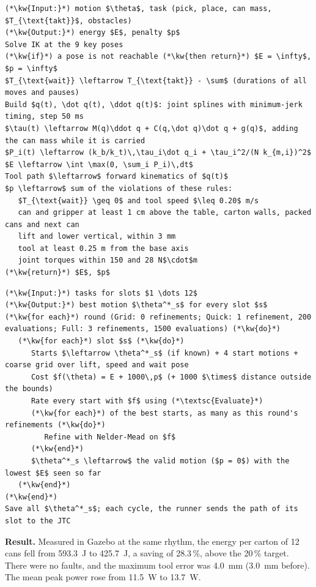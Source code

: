 \documentclass[12pt,a4paper]{article}
\newcommand{\kw}[1]{\textbf{#1}}
\begin{document}
\noindent\begin{minipage}{\linewidth}
\label{alg:eval}
\begin{lstlisting}[style=pseudostyle]
(*\kw{Input:}*) motion $\theta$, task (pick, place, can mass, $T_{\text{takt}}$, obstacles)
(*\kw{Output:}*) energy $E$, penalty $p$
Solve IK at the 9 key poses
(*\kw{if}*) a pose is not reachable (*\kw{then return}*) $E = \infty$, $p = \infty$
$T_{\text{wait}} \leftarrow T_{\text{takt}} - \sum$ (durations of all moves and pauses)
Build $q(t), \dot q(t), \ddot q(t)$: joint splines with minimum-jerk timing, step 50 ms
$\tau(t) \leftarrow M(q)\ddot q + C(q,\dot q)\dot q + g(q)$, adding the can mass while it is carried
$P_i(t) \leftarrow (k_b/k_t)\,\tau_i\dot q_i + \tau_i^2/(N k_{m,i})^2$
$E \leftarrow \int \max(0, \sum_i P_i)\,dt$
Tool path $\leftarrow$ forward kinematics of $q(t)$
$p \leftarrow$ sum of the violations of these rules:
   $T_{\text{wait}} \geq 0$ and tool speed $\leq 0.20$ m/s
   can and gripper at least 1 cm above the table, carton walls, packed cans and next can
   lift and lower vertical, within 3 mm
   tool at least 0.25 m from the base axis
   joint torques within 150 and 28 N$\cdot$m
(*\kw{return}*) $E$, $p$
\end{lstlisting}
\end{minipage}

\vspace{0.8cm}

\noindent\begin{minipage}{\linewidth}
\label{alg:opt}
\begin{lstlisting}[style=pseudostyle]
(*\kw{Input:}*) tasks for slots $1 \dots 12$
(*\kw{Output:}*) best motion $\theta^*_s$ for every slot $s$
(*\kw{for each}*) round (Grid: 0 refinements; Quick: 1 refinement, 200 evaluations; Full: 3 refinements, 1500 evaluations) (*\kw{do}*)
   (*\kw{for each}*) slot $s$ (*\kw{do}*)
      Starts $\leftarrow \theta^*_s$ (if known) + 4 start motions + coarse grid over lift, speed and wait pose
      Cost $f(\theta) = E + 1000\,p$ (+ 1000 $\times$ distance outside the bounds)
      Rate every start with $f$ using (*\textsc{Evaluate}*)
      (*\kw{for each}*) of the best starts, as many as this round's refinements (*\kw{do}*)
         Refine with Nelder-Mead on $f$
      (*\kw{end}*)
      $\theta^*_s \leftarrow$ the valid motion ($p = 0$) with the lowest $E$ seen so far
   (*\kw{end}*)
(*\kw{end}*)
Save all $\theta^*_s$; each cycle, the runner sends the path of its slot to the JTC
\end{lstlisting}
\end{minipage}

\vspace{0.5cm}

\noindent\textbf{Result.} Measured in Gazebo at the same rhythm, the energy per carton of 12 cans fell from 593.3~J to 425.7~J, a saving of 28.3\,\%, above the 20\,\% target. There were no faults, and the maximum tool error was 4.0~mm (3.0~mm before). The mean peak power rose from 11.5~W to 13.7~W.
\end{document}
